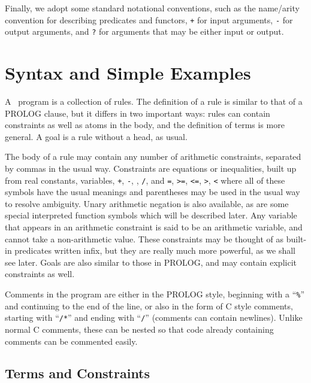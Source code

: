 Finally, we adopt some standard notational conventions, 
such as the name/arity convention for describing predicates and functors, 
{\tt +} for input arguments, {\tt -} for output arguments, and {\tt ?} for 
arguments that may be either input or output.

\chapter{Syntax and Simple Examples} \label{syntax-examples}

A \CLPR\ program is a collection of rules. 
The definition of a
rule is similar to that of a PROLOG clause, but it differs in two 
important ways: rules can contain constraints as well as atoms in the body,
and the definition of terms is more general. A goal is a rule without a head,
as usual.

The body of a rule may contain any number of arithmetic
constraints, separated by commas in the usual way.
Constraints are equations or inequalities, built up from real
constants, variables, {\tt +}, {\tt -}, {\tt *}, {\tt /}, and 
{\tt =}, {\tt >=}, {\tt <=}, {\tt >}, {\tt <}
where all of these symbols have the usual meanings and parentheses
may be used in the usual way to resolve ambiguity.  Unary arithmetic 
negation is also available, as are some special
interpreted function symbols which will be described later.
Any variable that
appears in an arithmetic constraint is said to be an arithmetic variable, 
and cannot take a non-arithmetic value. These constraints may be thought of as
built-in predicates written infix, but they are really much more powerful, as
we shall see later. Goals are also similar to those in PROLOG, and may
contain explicit constraints as well.

Comments in the program are either in the PROLOG style,
beginning with a ``{\tt \%}'' and continuing to the
end of the line, or
also in the form of C style comments, starting with ``{\tt /*}''
and ending with ``{\tt */}'' (comments can contain newlines).
Unlike normal C comments, these can be nested so that
code already containing comments can be commented easily. 

\section{Terms and Constraints}

